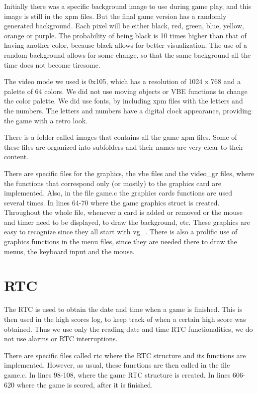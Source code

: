 \documentclass[11pt,a4paper,reqno]{report}
\numberwithin{equation}{section}
\begin{document}
Initially there was a specific background image to use during game play, and this image is still in the xpm files. But the final game version has a randomly generated background. Each pixel will be either black, red, green, blue, yellow, orange or purple. The probability of being black is 10 times higher than that of having another color, because black allows for better visualization. The use of a random background allows for some change, so that the same background all the time does not become tiresome.

The video mode we used is 0x105, which has a resolution of 1024 x 768 and a palette of 64 colors. We did not use moving objects or VBE functions to change the color palette. We did use fonts, by including xpm files with the letters and the numbers. The letters and numbers have a digital clock appearance, providing the game with a retro look.

There is a folder called images that contains all the game xpm files. Some of these files are organized into subfolders and their names are very clear to their content.

There are specific files for the graphics, the vbe files and the video\_gr files, where the functions that correspond only (or mostly) to the graphics card are implemented. Also, in the file game.c the graphics cards functions are used several times. In lines 64-70 where the game graphics struct is created. Throughout the whole file, whenever a card is added or removed or the mouse and timer need to be displayed, to draw the background, etc. These graphics are easy to recognize since they all start with vg\_. There is also a prolific use of graphics functions in the menu files, since they are needed there to draw the menus, the keyboard input and the mouse.

\section{RTC}

The RTC is used to obtain the date and time when a game is finished. This is then used in the high scores log, to keep track of when a certain high score was obtained. Thus we use only the reading date and time RTC functionalities, we do not use alarms or RTC interruptions.

There are specific files called rtc where the RTC structure and its functions are implemented. However, as usual, these functions are then called in the file game.c. In lines 98-108, where the game RTC structure is created. In lines 606-620 where the game is scored, after it is finished.
\end{document}
